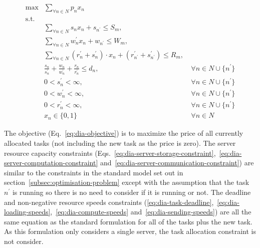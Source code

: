 \begin{align}
    \max & \sum_{\forall n \in N} p_n x_n\label{eq:dia-objective}\\
    \mbox{s.t.} \nonumber \\
    & \sum_{\forall n \in N} s_n x_n + s_{n^{'}} \leq S_m,\label{eq:dia-server-storage-constraint}\\
    & \sum_{\forall n \in N} w^{'}_n x_n + w_{n^{'}} \leq W_m, \label{eq:dia-server-computation-constraint}\\
    & \sum_{\forall n \in N} (r^{'}_n + s^{'}_n) \cdot x_n + (r^{'}_{n^{'}} + s^{'}_{n^{'}}) \leq R_m, \label{eq:dia-server-communication-constraint}\\
    & \frac{s_n}{s^{'}_n} + \frac{w_n}{w^{'}_n} + \frac{r_n}{r^{'}_n} \leq d_n, &~ \forall n \in N \cup \{n^{'}\} \label{eq:dia-task-deadline}\\
    & 0 < s^{'}_n < \infty, &~ \forall{n \in N \cup \{n^{'}\}} \label{eq:dia-loading-speeds}\\
    & 0 < w^{'}_n < \infty, &~ \forall{n \in N \cup \{n^{'}\}} \label{eq:dia-compute-speeds}\\
    & 0 < r^{'}_n < \infty, &~ \forall{n \in N \cup \{n^{'}\}} \label{eq:dia-sending-speeds}\\
    & x_n \in \{0,1\} &~ \forall{n \in N} \label{eq:dia-job-allocation}
\end{align}

The objective (Eq.~\eqref{eq:dia-objective}) is to maximize the price of all currently allocated tasks (not including
the new task as the price is zero). The server resource capacity constraints
(Eqs.~\eqref{eq:dia-server-storage-constraint},~\eqref{eq:dia-server-computation-constraint}
and~\eqref{eq:dia-server-communication-constraint}) are similar to the constraints in the standard model set out in
section~\ref{subsec:optimisation-problem} except with the assumption that the task $n^{'}$ is running so there is no
need to consider if it is running or not. The deadline and non-negative resource speeds constraints
(\ref{eq:dia-task-deadline},~\ref{eq:dia-loading-speeds},~\ref{eq:dia-compute-speeds} and~\ref{eq:dia-sending-speeds})
are all the same equation as the standard formulation for all of the tasks plus the new task. As this formulation only
considers a single server, the task allocation constraint is not consider.


